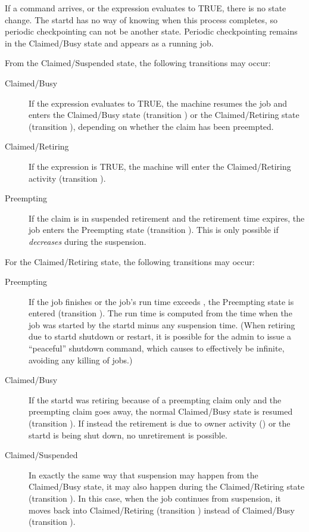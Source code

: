If a  command arrives,
or the  expression evaluates to TRUE,
there is no state change.
The startd has no way of knowing when this process completes,
so periodic checkpointing can not be another state.
Periodic checkpointing remains in the Claimed/Busy state
and appears as a running job.

From the Claimed/Suspended state, the following transitions
may occur:

\begin{description}
  
\item[Claimed/Busy] If the  expression evaluates to
  TRUE, the machine resumes the job and enters the
  Claimed/Busy state (transition ) or the Claimed/Retiring
  state (transition ), depending on whether the claim
  has been preempted.

\item[Claimed/Retiring] If the  expression is TRUE, the machine
  will enter the Claimed/Retiring activity (transition ).

\item[Preempting] If the claim is in suspended retirement and the
  retirement time expires, the job enters the Preempting state
  (transition ).  This is only possible if
   \emph{decreases} during the suspension.


\end{description}

For the Claimed/Retiring state, the following transitions may occur:

\begin{description}

\item[Preempting] If the job finishes or the job's run time exceeds
, the Preempting state is entered
(transition ).  The run time is computed from the time when the
job was started by the startd minus any suspension time.  (When retiring
due to startd shutdown or restart, it is possible for the admin to issue a
``peaceful'' shutdown command, which causes 
to effectively be infinite, avoiding any killing of jobs.)

\item[Claimed/Busy] If the startd was retiring because of a preempting
claim only and the preempting claim goes away, the normal Claimed/Busy
state is resumed (transition ).  If instead the retirement
is due to owner activity () or the startd is being shut down,
no unretirement is possible.

\item[Claimed/Suspended] In exactly the same way that suspension may
happen from the Claimed/Busy state, it may also happen during the
Claimed/Retiring state (transition ).
In this case, when the job continues from suspension, it moves back
into Claimed/Retiring (transition ) instead of Claimed/Busy
(transition ).

\end{description}


